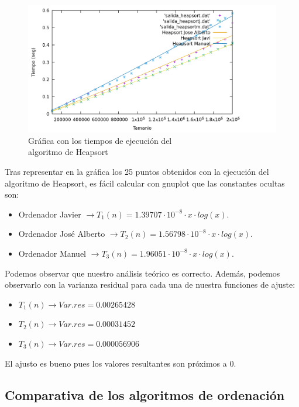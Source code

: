 \documentclass[10pt,a4paper]{article}
\begin{document}
\begin{figure}[h!]
\centering
\includegraphics[scale=0.15]{../../Images/Heapsort_combinados.png}
\caption{Gráfica con los tiempos de ejecución del \\algoritmo de Heapsort}
\end{figure}

Tras representar en la gráfica los 25 puntos obtenidos con la ejecución del algoritmo de Heapsort, es fácil calcular con gnuplot que las constantes ocultas son:
\begin{itemize}
	\item Ordenador Javier \(\rightarrow T_1(n) = 1.39707 \cdot 10^{-8} \cdot x \cdot log(x)\). 
	\item Ordenador José Alberto \(\rightarrow T_2(n) = 1.56798 \cdot 10^{-8} \cdot x \cdot log(x)\).
	\item Ordenador Manuel \(\rightarrow T_3(n) = 1.96051 \cdot 10^{-8} \cdot x \cdot log(x)\).
\end{itemize} 

Podemos observar que nuestro análisis teórico es correcto. Además, podemos observarlo con la varianza residual para cada una de nuestra funciones de ajuste:
\begin{itemize}
	\item \(T_1(n) \longrightarrow Var.res = 0.00265428\)
	\item \(T_2(n) \longrightarrow Var.res = 0.00031452\)
	\item \(T_3(n) \longrightarrow Var.res = 0.000056906\)
\end{itemize}

El ajusto es bueno pues los valores resultantes son próximos a 0.

\subsection{Comparativa de los algoritmos de ordenación}
\end{document}
